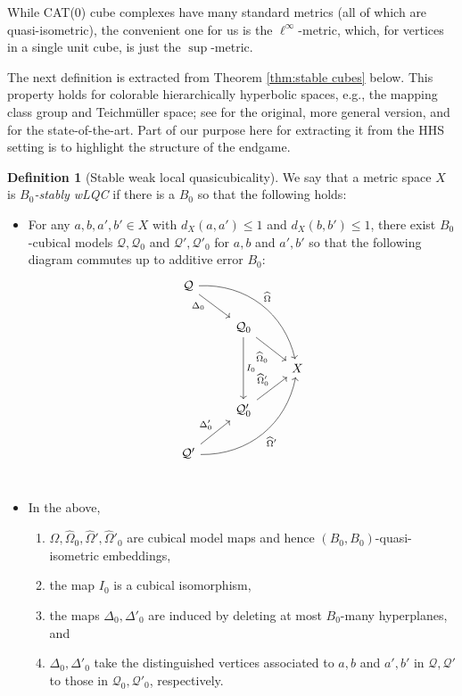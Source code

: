 \documentclass{amsart}
\theoremstyle{definition}
\newtheorem{definition}[theorem]{Definition}
\theoremstyle{remark}
\theoremstyle{definition}
\newcommand{\calQ}{\mathcal{Q}}
\newcommand{\hO}{\widehat{\Omega}}
\begin{document}
 While CAT(0) cube complexes have many standard metrics (all of which are quasi-isometric), the convenient one for us is the $\ell^{\infty}$-metric, which, for vertices in a single unit cube, is just the $\sup$-metric. 

The next definition is extracted from Theorem \ref{thm:stable cubes} below.  This property holds for colorable hierarchically hyperbolic spaces, e.g., the mapping class group and Teichm\"uller space; see \cite[Theorem 4.1]{DMS_bary} for the original, more general version, and \cite[Theorem 9.1]{DMS_FJ} for the state-of-the-art.  Part of our purpose here for extracting it from the HHS setting is to highlight the structure of the endgame.


\begin{definition}[Stable weak local quasicubicality]\label{defn:stable cubes}
We say that a metric space $X$ is \emph{$B_0$-stably wLQC} if there is a $B_0$ so that the following holds:  

\begin{itemize}
\item For any $a,b, a',b' \in X$ with $d_X(a,a') \leq 1$ and $d_X(b,b')\leq 1$, there exist $B_0$-cubical models $\calQ, \calQ_0$ and $\calQ',\calQ'_0$ for $a,b$ and $a',b'$ so that the following diagram commutes up to additive error $B_0$:
\begin{equation}\label{Phi diagram, early}
  \begin{tikzcd}
   \calQ \arrow[ddrr,"\hO", bend left=40] \arrow[dr,"\Delta_0 \hspace{.075in}" left] &  \\
    &\calQ_{0} \arrow[dr,"\hO_0 \hspace{.2in}" below]\arrow[dd, "I_0"] \\
    & & X\\
    & \calQ'_{0} \arrow[ur,"\hO'_0"] \\
    \calQ'\arrow[uurr,"\hspace{.2in} \vspace{.1in} \hO'" below, bend right=40] \arrow[ur,"\Delta'_0"] & \\
  \end{tikzcd}
  \end{equation}
 \item In the above,
  \begin{enumerate}
  \item  $\hO, \hO_0, \hO', \hO'_0$ are cubical model maps and hence $(B_0,B_0)$-quasi-isometric embeddings,
  \item the map $I_0$ is a cubical isomorphism,
  \item the maps $\Delta_0, \Delta'_0$ are induced by deleting at most $B_0$-many hyperplanes, and
  \item $\Delta_0, \Delta'_0$ take the distinguished vertices associated to $a,b$ and $a',b'$ in $\calQ,\calQ'$ to those in $\calQ_0,\calQ'_0$, respectively.
  \end{enumerate}
  \end{itemize}
\end{definition}
\end{document}
